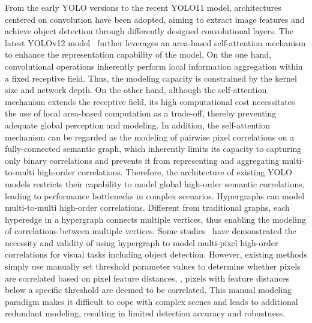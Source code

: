 From the early YOLO versions to the recent YOLO11 model, architectures centered on convolution have been adopted, aiming to extract image features and achieve object detection through differently designed convolutional layers. The latest YOLOv12 model~\cite{yolov12} further leverages an area-based self-attention mechanism to enhance the representation capability of the model. On the one hand, convolutional operations inherently perform local information aggregation within a fixed receptive field. Thus, the modeling capacity is constrained by the kernel size and network depth. On the other hand, although the self-attention mechanism extends the receptive field, its high computational cost necessitates the use of local area-based computation as a trade-off, thereby preventing adequate global perception and modeling. In addition, the self-attention mechanism can be regarded as the modeling of pairwise pixel correlations on a fully-connected semantic graph, which inherently limits its capacity to capturing only binary correlations and prevents it from representing and aggregating multi-to-multi high-order correlations. Therefore, the architecture of existing YOLO models restricts their capability to model global high-order semantic correlations, leading to performance bottlenecks in complex scenarios. Hypergraphs can model multi-to-multi high-order correlations. Different from traditional graphs, each hyperedge in a hypergraph connects multiple vertices, thus enabling the modeling of correlations between multiple vertices. Some studies~\cite{vihgnn,hgvit,hgformer} have demonstrated the necessity and validity of using hypergraph to model multi-pixel high-order correlations for visual tasks including object detection. However, existing methods simply use manually set threshold parameter values to determine whether pixels are correlated based on pixel feature distances, \ie, pixels with feature distances below a specific threshold are deemed to be correlated. This manual modeling paradigm makes it difficult to cope with complex scenes and leads to additional redundant modeling, resulting in limited detection accuracy and robustness.

